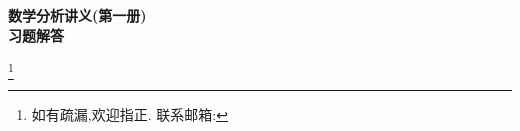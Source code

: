 \documentclass[lang=cn,12pt,scheme=chinese,founder,mode=simple,black]{elegantbook}
\newcommand\blfootnote[1]{%
    \begingroup
    \renewcommand\thefootnote{}%
    \footnote{#1}%
    \addtocounter{footnote}{-1}%
    \endgroup
}
\begin{document}
\begin{titlepage}
    \vspace*{\fill} %
    \begin{center}
        {\Huge \textbf{数学分析讲义(第一册)}} \\[0.5cm]

        {\Huge \textbf{习题解答}} \\[1cm]

    \end{center}
    \vspace*{\fill} %

    \blfootnote{如有疏漏,欢迎指正. 联系邮箱: }
\end{titlepage}

\tableofcontents

\mainmatter





\end{document}
